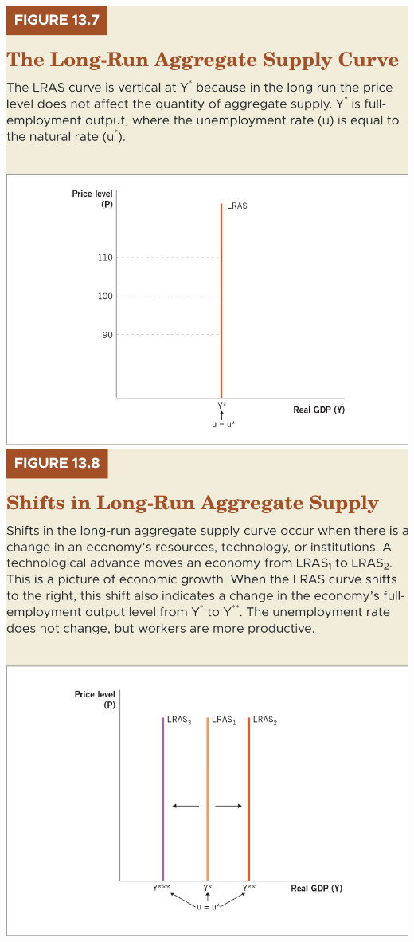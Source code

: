\documentclass[11pt]{article} %
\begin{document}
\begin{center}
\includegraphics[scale=0.52]{images/Figure 13.7.png} 
\includegraphics[scale=0.5]{images/Figure 13.8.png}
\end{center}
\end{document}
